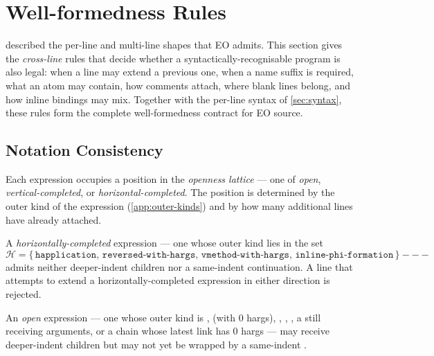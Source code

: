 
\section{Well-formedness Rules}\label{sec:wellformedness}

 described the per-line and multi-line shapes that EO admits.
This section gives the \emph{cross-line} rules that decide whether a
  syntactically-recognisable program is also legal:
  when a line may extend a previous one,
  when a name suffix is required,
  what an atom may contain,
  how comments attach,
  where blank lines belong,
  and how inline bindings may mix.
Together with the per-line syntax of \cref{sec:syntax},
  these rules form the complete well-formedness contract for EO source.

\subsection{Notation Consistency}\label{sec:wf:notation}

Each expression occupies a position in the \emph{openness lattice} ---
  one of \emph{open}, \emph{vertical-completed}, or \emph{horizontal-completed}.
The position is determined by the outer kind of the expression
  (\cref{app:outer-kinds}) and by how many additional lines have already
  attached.

A \emph{horizontally-completed} expression
  --- one whose outer kind lies in the set
\begin{equation*}
  \mathcal{H} = \{\,
    \mathtt{happlication},\,
    \mathtt{reversed\text{-}with\text{-}hargs},\,
    \mathtt{vmethod\text{-}with\text{-}hargs},\,
    \mathtt{inline\text{-}phi\text{-}formation}
    \,\} ---
\end{equation*}
admits neither deeper-indent children nor a same-indent 
  continuation.
A line that attempts to extend a horizontally-completed expression in either
  direction is rejected.

An \emph{open} expression --- one whose outer kind is
  ,  (with 0 hargs), ,
  , , a  still receiving
  arguments, or a  chain whose latest  link has 0
  hargs --- may receive deeper-indent children but may not yet be wrapped by
  a same-indent .

